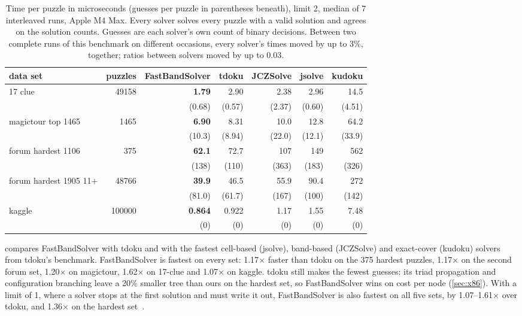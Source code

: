 \documentclass[11pt]{article}
\theoremstyle{definition}
\theoremstyle{plain}
\begin{document}
\begin{table}[t]
\centering
\caption{Time per puzzle in microseconds (guesses per puzzle in parentheses beneath), limit 2, median of 7 interleaved runs, Apple M4 Max.
Every solver solves every puzzle with a valid solution and agrees on the solution counts. Guesses are each solver's
own count of binary decisions. Between two complete runs of this benchmark on different occasions, every solver's
times moved by up to 3\%, together; ratios between solvers moved by up to 0.03.}
\label{tab:sota}
\small
\setlength{\tabcolsep}{4pt}
\begin{tabular}{lrrrrrr}
\toprule
data set & puzzles & FastBandSolver & tdoku & JCZSolve & jsolve & kudoku \\
\midrule
17 clue & 49158 & \textbf{1.79} & 2.90 & 2.38 & 2.96 & 14.5 \\
&& (0.68) & (0.57) & (2.37) & (0.60) & (4.51) \\[2pt]
magictour top 1465 & 1465 & \textbf{6.90} & 8.31 & 10.0 & 12.8 & 64.2 \\
&& (10.3) & (8.94) & (22.0) & (12.1) & (33.9) \\[2pt]
forum hardest 1106 & 375 & \textbf{62.1} & 72.7 & 107 & 149 & 562 \\
&& (138) & (110) & (363) & (183) & (326) \\[2pt]
forum hardest 1905 11+ & 48766 & \textbf{39.9} & 46.5 & 55.9 & 90.4 & 272 \\
&& (81.0) & (61.7) & (167) & (100) & (142) \\[2pt]
kaggle & 100000 & \textbf{0.864} & 0.922 & 1.17 & 1.55 & 7.48 \\
&& (0) & (0) & (0) & (0) & (0) \\[2pt]
\bottomrule
\end{tabular}
\end{table}

 compares FastBandSolver with tdoku and with the fastest cell-based (jsolve), band-based (JCZSolve) and
exact-cover (kudoku) solvers from tdoku's benchmark. FastBandSolver is fastest on every set: 1.17$\times$ faster than
tdoku on the 375 hardest puzzles, 1.17$\times$ on the second forum set, 1.20$\times$ on magictour, 1.62$\times$ on
17-clue and 1.07$\times$ on kaggle. tdoku still makes the fewest guesses: its triad propagation and configuration
branching leave a 20\% smaller tree than ours on the hardest set, so FastBandSolver wins on cost per node
(\cref{sec:x86}). With a limit of 1, where a solver stops at the first solution and must write it out,
FastBandSolver is also fastest on all five sets, by 1.07--1.61$\times$ over tdoku, and 1.36$\times$ on the hardest
set~\cite{kelly2026full}.
\end{document}
